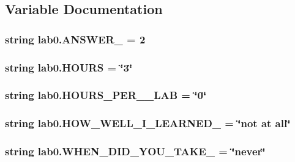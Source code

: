 \subsection{Variable Documentation}
\hypertarget{namespacelab0_a90009da8915954e94172bca8529ac1ba}{}
\subsubsection[{A\+N\+S\+W\+E\+R\+\_\+1}]{\setlength{\rightskip}{0pt plus 5cm}string lab0.\+A\+N\+S\+W\+E\+R\+\_ = \textquotesingle{}2\textquotesingle{}}\label{namespacelab0_a90009da8915954e94172bca8529ac1ba}
\hypertarget{namespacelab0_a54acc2ffbf288940060f87b477c960c0}{}
\subsubsection[{H\+O\+U\+R\+S}]{\setlength{\rightskip}{0pt plus 5cm}string lab0.\+H\+O\+U\+R\+S = \char`\"{}3\char`\"{}}\label{namespacelab0_a54acc2ffbf288940060f87b477c960c0}
\hypertarget{namespacelab0_a580dd96a5375d581fec8ad05bf81e2b0}{}
\subsubsection[{H\+O\+U\+R\+S\+\_\+\+P\+E\+R\+\_\+601\+\_\+\+L\+A\+B}]{\setlength{\rightskip}{0pt plus 5cm}string lab0.\+H\+O\+U\+R\+S\+\_\+\+P\+E\+R\+\_\+\_\+\+L\+A\+B = \char`\"{}0\char`\"{}}\label{namespacelab0_a580dd96a5375d581fec8ad05bf81e2b0}
\hypertarget{namespacelab0_a3749a0ef20b6222b5fd3c772a7cf3718}{}
\subsubsection[{H\+O\+W\+\_\+\+W\+E\+L\+L\+\_\+\+I\+\_\+\+L\+E\+A\+R\+N\+E\+D\+\_\+601}]{\setlength{\rightskip}{0pt plus 5cm}string lab0.\+H\+O\+W\+\_\+\+W\+E\+L\+L\+\_\+\+I\+\_\+\+L\+E\+A\+R\+N\+E\+D\+\_ = \char`\"{}not at all\char`\"{}}\label{namespacelab0_a3749a0ef20b6222b5fd3c772a7cf3718}
\hypertarget{namespacelab0_acd488bd06939b07429c2b9e072d99da3}{}
\subsubsection[{W\+H\+E\+N\+\_\+\+D\+I\+D\+\_\+\+Y\+O\+U\+\_\+\+T\+A\+K\+E\+\_\+601}]{\setlength{\rightskip}{0pt plus 5cm}string lab0.\+W\+H\+E\+N\+\_\+\+D\+I\+D\+\_\+\+Y\+O\+U\+\_\+\+T\+A\+K\+E\+\_ = \char`\"{}never\char`\"{}}\label{namespacelab0_acd488bd06939b07429c2b9e072d99da3}
